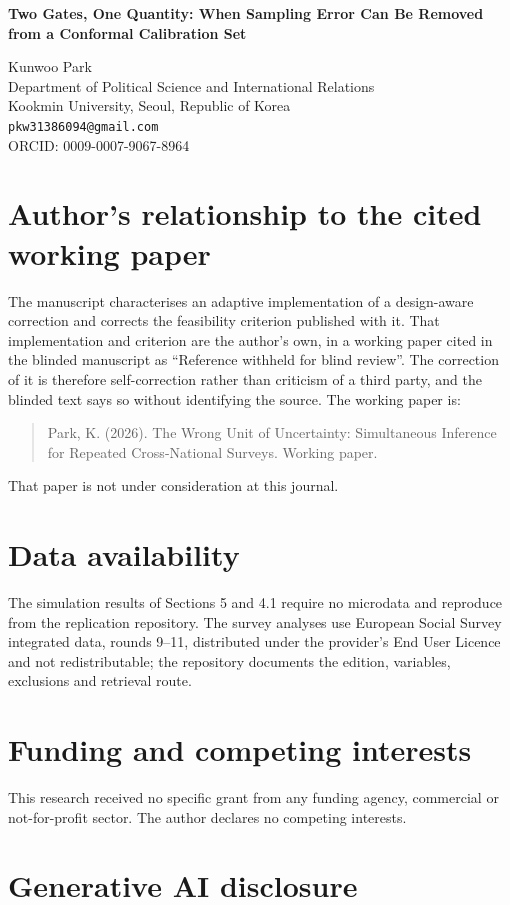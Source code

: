 \documentclass[12pt]{article}
\begin{document}
\begin{center}
{\large\bfseries Two Gates, One Quantity: When Sampling Error Can Be Removed
from a Conformal Calibration Set}

\vspace{2em}
Kunwoo Park\\
Department of Political Science and International Relations\\
Kookmin University, Seoul, Republic of Korea\\
\texttt{pkw31386094@gmail.com}\\
ORCID: 0009-0007-9067-8964
\end{center}

\vspace{2em}
\section*{Author's relationship to the cited working paper}
The manuscript characterises an adaptive implementation of a design-aware
correction and corrects the feasibility criterion published with it. That
implementation and criterion are the author's own, in a working paper cited in
the blinded manuscript as ``Reference withheld for blind review''. The
correction of it is therefore self-correction rather than criticism of a third
party, and the blinded text says so without identifying the source. The working
paper is:

\begin{quote}
Park, K. (2026). The Wrong Unit of Uncertainty: Simultaneous Inference for
Repeated Cross-National Surveys. Working paper.
\end{quote}

That paper is not under consideration at this journal.

\section*{Data availability}
The simulation results of Sections 5 and 4.1 require no microdata and reproduce
from the replication repository. The survey analyses use European Social Survey
integrated data, rounds 9--11, distributed under the provider's End User
Licence and not redistributable; the repository documents the edition,
variables, exclusions and retrieval route.

\section*{Funding and competing interests}
This research received no specific grant from any funding agency, commercial or
not-for-profit sector. The author declares no competing interests.

\section*{Generative AI disclosure}
\end{document}
